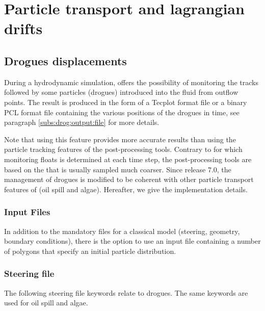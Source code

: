 \chapter{Particle transport and lagrangian drifts}
\label{ch:part:transp}

\section{Drogues displacements}
\label{sec:drog:displ}
During a hydrodynamic simulation,  offers the possibility
of monitoring the tracks followed by some particles (drogues) introduced
into the fluid from outflow points.
The result is produced in the form of a Tecplot format file or a binary PCL
format file containing the various positions of the drogues in time,
see paragraph \ref{subs:drog:output:file} for more details.

Note that using this feature provides more accurate results than using
the particle tracking features of the post-processing tools.
Contrary to  for which monitoring floats is determined at each time
step, the post-processing tools are based on the 
that is usually sampled much coarser.
Since release 7.0, the management of drogues is modified to be coherent with
other particle transport features of  (oil spill and algae).
Hereafter, we give the implementation details.

\subsection{Input Files}
\label{subs:drog:inp:fil}
In addition to the mandatory files for a classical  model
(steering, geometry, boundary conditions),
there is the option to use an input file containing a number of polygons
that specify an initial particle distribution.

\subsection{Steering file}
\label{subs:drog:steer:file}
The following steering file keywords relate to drogues.
The same keywords are used for oil spill and algae.

